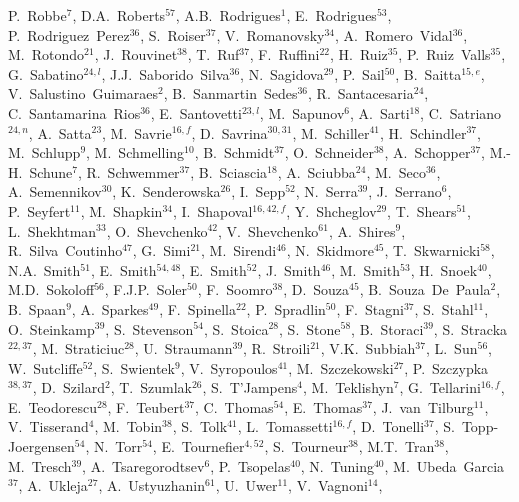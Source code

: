 \documentclass[12pt,a4paper]{article}
\begin{document}
\begin{flushleft}
P.~Robbe$^{7}$, 
D.A.~Roberts$^{57}$, 
A.B.~Rodrigues$^{1}$, 
E.~Rodrigues$^{53}$, 
P.~Rodriguez~Perez$^{36}$, 
S.~Roiser$^{37}$, 
V.~Romanovsky$^{34}$, 
A.~Romero~Vidal$^{36}$, 
M.~Rotondo$^{21}$, 
J.~Rouvinet$^{38}$, 
T.~Ruf$^{37}$, 
F.~Ruffini$^{22}$, 
H.~Ruiz$^{35}$, 
P.~Ruiz~Valls$^{35}$, 
G.~Sabatino$^{24,l}$, 
J.J.~Saborido~Silva$^{36}$, 
N.~Sagidova$^{29}$, 
P.~Sail$^{50}$, 
B.~Saitta$^{15,e}$, 
V.~Salustino~Guimaraes$^{2}$, 
B.~Sanmartin~Sedes$^{36}$, 
R.~Santacesaria$^{24}$, 
C.~Santamarina~Rios$^{36}$, 
E.~Santovetti$^{23,l}$, 
M.~Sapunov$^{6}$, 
A.~Sarti$^{18}$, 
C.~Satriano$^{24,n}$, 
A.~Satta$^{23}$, 
M.~Savrie$^{16,f}$, 
D.~Savrina$^{30,31}$, 
M.~Schiller$^{41}$, 
H.~Schindler$^{37}$, 
M.~Schlupp$^{9}$, 
M.~Schmelling$^{10}$, 
B.~Schmidt$^{37}$, 
O.~Schneider$^{38}$, 
A.~Schopper$^{37}$, 
M.-H.~Schune$^{7}$, 
R.~Schwemmer$^{37}$, 
B.~Sciascia$^{18}$, 
A.~Sciubba$^{24}$, 
M.~Seco$^{36}$, 
A.~Semennikov$^{30}$, 
K.~Senderowska$^{26}$, 
I.~Sepp$^{52}$, 
N.~Serra$^{39}$, 
J.~Serrano$^{6}$, 
P.~Seyfert$^{11}$, 
M.~Shapkin$^{34}$, 
I.~Shapoval$^{16,42,f}$, 
Y.~Shcheglov$^{29}$, 
T.~Shears$^{51}$, 
L.~Shekhtman$^{33}$, 
O.~Shevchenko$^{42}$, 
V.~Shevchenko$^{61}$, 
A.~Shires$^{9}$, 
R.~Silva~Coutinho$^{47}$, 
G.~Simi$^{21}$, 
M.~Sirendi$^{46}$, 
N.~Skidmore$^{45}$, 
T.~Skwarnicki$^{58}$, 
N.A.~Smith$^{51}$, 
E.~Smith$^{54,48}$, 
E.~Smith$^{52}$, 
J.~Smith$^{46}$, 
M.~Smith$^{53}$, 
H.~Snoek$^{40}$, 
M.D.~Sokoloff$^{56}$, 
F.J.P.~Soler$^{50}$, 
F.~Soomro$^{38}$, 
D.~Souza$^{45}$, 
B.~Souza~De~Paula$^{2}$, 
B.~Spaan$^{9}$, 
A.~Sparkes$^{49}$, 
F.~Spinella$^{22}$, 
P.~Spradlin$^{50}$, 
F.~Stagni$^{37}$, 
S.~Stahl$^{11}$, 
O.~Steinkamp$^{39}$, 
S.~Stevenson$^{54}$, 
S.~Stoica$^{28}$, 
S.~Stone$^{58}$, 
B.~Storaci$^{39}$, 
S.~Stracka$^{22,37}$, 
M.~Straticiuc$^{28}$, 
U.~Straumann$^{39}$, 
R.~Stroili$^{21}$, 
V.K.~Subbiah$^{37}$, 
L.~Sun$^{56}$, 
W.~Sutcliffe$^{52}$, 
S.~Swientek$^{9}$, 
V.~Syropoulos$^{41}$, 
M.~Szczekowski$^{27}$, 
P.~Szczypka$^{38,37}$, 
D.~Szilard$^{2}$, 
T.~Szumlak$^{26}$, 
S.~T'Jampens$^{4}$, 
M.~Teklishyn$^{7}$, 
G.~Tellarini$^{16,f}$, 
E.~Teodorescu$^{28}$, 
F.~Teubert$^{37}$, 
C.~Thomas$^{54}$, 
E.~Thomas$^{37}$, 
J.~van~Tilburg$^{11}$, 
V.~Tisserand$^{4}$, 
M.~Tobin$^{38}$, 
S.~Tolk$^{41}$, 
L.~Tomassetti$^{16,f}$, 
D.~Tonelli$^{37}$, 
S.~Topp-Joergensen$^{54}$, 
N.~Torr$^{54}$, 
E.~Tournefier$^{4,52}$, 
S.~Tourneur$^{38}$, 
M.T.~Tran$^{38}$, 
M.~Tresch$^{39}$, 
A.~Tsaregorodtsev$^{6}$, 
P.~Tsopelas$^{40}$, 
N.~Tuning$^{40}$, 
M.~Ubeda~Garcia$^{37}$, 
A.~Ukleja$^{27}$, 
A.~Ustyuzhanin$^{61}$, 
U.~Uwer$^{11}$, 
V.~Vagnoni$^{14}$, 

\end{flushleft}
\end{document}
